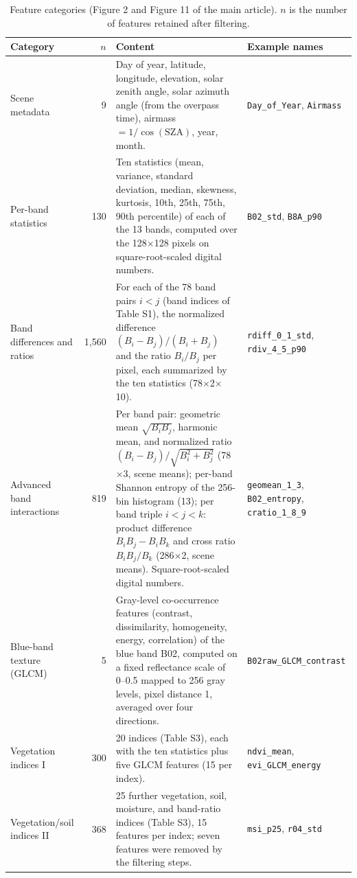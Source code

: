 \documentclass[draft,ea]{agutexSI2019}
\begin{document}
\begin{table}
\caption{Feature categories (Figure 2 and Figure 11 of the main article). $n$ is the number of features retained after filtering.}
\centering
\small\baselineskip=11pt\normalbaselineskip=11pt
\begin{tabular}{p{} r p{} p{}}
\hline
Category & $n$ & Content & Example names \\
\hline
Scene metadata & 9 & Day of year, latitude, longitude, elevation, solar zenith angle, solar azimuth angle (from the overpass time), airmass $=1/\cos(\mathrm{SZA})$, year, month. & \texttt{Day\_of\_Year}, \texttt{Airmass} \\
Per-band statistics & 130 & Ten statistics (mean, variance, standard deviation, median, skewness, kurtosis, 10th, 25th, 75th, 90th percentile) of each of the 13 bands, computed over the 128$\times$128 pixels on square-root-scaled digital numbers. & \texttt{B02\_std}, \texttt{B8A\_p90} \\
Band differences and ratios & 1,560 & For each of the 78 band pairs $i<j$ (band indices of Table S1), the normalized difference $(B_i-B_j)/(B_i+B_j)$ and the ratio $B_i/B_j$ per pixel, each summarized by the ten statistics (78$\times$2$\times$10). & \texttt{rdiff\_0\_1\_std}, \texttt{rdiv\_4\_5\_p90} \\
Advanced band interactions & 819 & Per band pair: geometric mean $\sqrt{B_iB_j}$, harmonic mean, and normalized ratio $(B_i-B_j)/\sqrt{B_i^2+B_j^2}$ (78$\times$3, scene means); per-band Shannon entropy of the 256-bin histogram (13); per band triple $i<j<k$: product difference $B_iB_j-B_iB_k$ and cross ratio $B_iB_j/B_k$ (286$\times$2, scene means). Square-root-scaled digital numbers. & \texttt{geomean\_1\_3}, \texttt{B02\_entropy}, \texttt{cratio\_1\_8\_9} \\
Blue-band texture (GLCM) & 5 & Gray-level co-occurrence features (contrast, dissimilarity, homogeneity, energy, correlation) of the blue band B02, computed on a fixed reflectance scale of 0--0.5 mapped to 256 gray levels, pixel distance 1, averaged over four directions. & \texttt{B02raw\_GLCM\_contrast} \\
Vegetation indices I & 300 & 20 indices (Table S3), each with the ten statistics plus five GLCM features (15 per index). & \texttt{ndvi\_mean}, \texttt{evi\_GLCM\_energy} \\
Vegetation/soil indices II & 368 & 25 further vegetation, soil, moisture, and band-ratio indices (Table S3), 15 features per index; seven features were removed by the filtering steps. & \texttt{msi\_p25}, \texttt{r04\_std} \\

\end{tabular}
\end{table}
\end{document}
